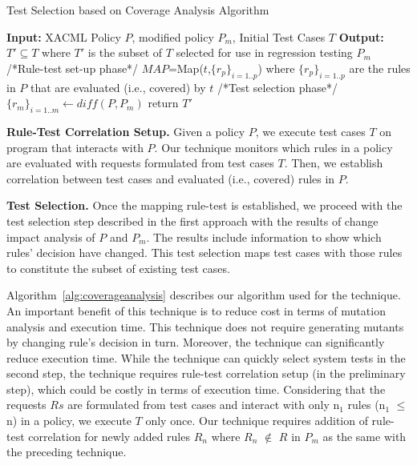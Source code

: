 \begin{algorithmic}
\begin{algorithm}[t]
\caption{\label{alg:coverageanalysis}Test Selection based on Coverage Analysis Algorithm}
\STATE \textbf{Input:} XACML Policy $P$, modified policy $P_{m}$, Initial Test Cases $T$
\STATE \textbf{Output:} $T' \subseteq T$ where $T'$ is the subset of $T$ selected for use in regression testing $P_{m}$
\STATE /*Rule-test set-up phase*/
\STATE $MAP$=Map($t$,$\{r_{p}\}_{i=1..p}$) where $\{r_{p}\}_{i=1..p}$ are the rules in $P$ that are evaluated (i.e., covered) by $t$
\ENDFOR
\STATE /*Test selection phase*/
\STATE $\{r_{m}\}_{i=1..m} \leftarrow diff(P,P_{m})$
\ENDFOR
\STATE return $T'$
\end{algorithm}
\end{algorithmic}

\textbf{Rule-Test Correlation Setup.} Given a policy $P$, we execute test cases $T$ on program that interacts with $P$. Our technique monitors which rules in a policy are evaluated with
requests formulated from test cases $T$. Then, we establish correlation between test cases and evaluated (i.e., covered) rules in $P$. 

\textbf{Test Selection.}
Once the mapping rule-test is established, we proceed with the test selection step described in the first approach with
the results of change impact analysis of $P$ and $P_m$. The results include information to show which rules' decision have changed.
This test selection maps test cases with those rules to constitute the subset of existing test cases.

Algorithm~\ref{alg:coverageanalysis} describes our algorithm used for the technique.
An important benefit of this technique is to reduce cost in terms of mutation analysis and execution time. This technique does not 
require generating mutants by changing rule's decision in turn. Moreover, the technique can significantly reduce execution time.
While the technique can quickly select system tests in the second step, the technique requires rule-test correlation setup (in the preliminary step), 
which could be costly in terms of execution time. Considering that the requests $Rs$ are formulated from test cases and interact with only n$_1$ rules (n$_1$ $\leq$ n) in a policy, 
we execute $T$ only once. Our technique requires addition of rule-test correlation for newly added rules $R_n$ where $R_n$ $\notin$ $R$ in $P_m$ as the same with the preceding technique.


